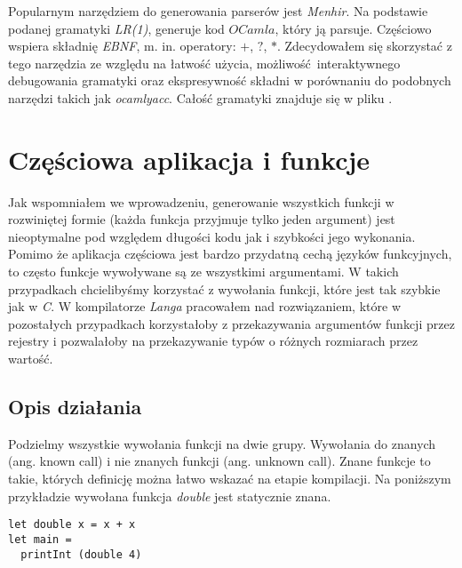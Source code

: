 \documentclass[declaration,shortabstract]{iithesis}
\begin{document}
Popularnym narzędziem do generowania parserów jest \textit{Menhir}. Na 
\newline podstawie podanej gramatyki \textit{LR(1)}, generuje kod $OCamla$, 
który ją parsuje. Częściowo wspiera składnię \textit{EBNF}, m. in. operatory: $
+$, $?$, $\ast$. Zdecydowałem się skorzystać z tego narzędzia ze względu na 
łatwość użycia, możliwość interaktywnego debugowania gramatyki oraz 
ekspresywność składni w porównaniu do podobnych narzędzi takich jak \textit
{ocamlyacc}. Całość gramatyki znajduje się w pliku 
. 

\section{Częściowa aplikacja i funkcje}

Jak wspomniałem we wprowadzeniu, generowanie wszystkich funkcji w rozwiniętej 
formie (każda funkcja przyjmuje tylko jeden argument) jest nieoptymalne pod
względem długości kodu jak i szybkości jego wykonania. Pomimo że aplikacja 
częściowa jest bardzo przydatną cechą języków funkcyjnych, to często funkcje
wywoływane są ze wszystkimi argumentami. W takich przypadkach chcielibyśmy 
korzystać z wywołania funkcji, które jest tak szybkie jak w \textit{C}. 
W kompilatorze \textit{Langa} pracowałem nad rozwiązaniem, które w pozostałych 
przypadkach korzystałoby z przekazywania argumentów funkcji przez rejestry i 
pozwalałoby na przekazywanie typów o różnych rozmiarach przez wartość. 

\subsection{Opis działania}

Podzielmy wszystkie wywołania funkcji na dwie grupy. Wywołania do znanych 
(ang. known call) i nie znanych funkcji (ang. unknown call). Znane funkcje to 
takie, których definicję można łatwo wskazać na etapie kompilacji. 
Na poniższym przykładzie wywołana funkcja \textit{double} jest statycznie znana.

\begin{lstlisting}[frame=single, caption=Wywołanie statycznie znanej funkcji.] 
let double x = x + x
let main = 
  printInt (double 4)
\end{lstlisting}
\end{document}
